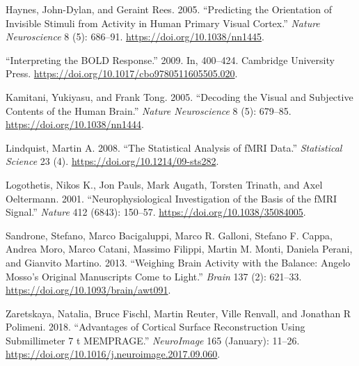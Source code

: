 \documentclass[
  letterpaper,
]{report}
\newlength{\cslhangindent}
\newenvironment{CSLReferences}[2] %
 {\begin{list}{}{%
  \setlength{\itemindent}{0pt}
  \setlength{\leftmargin}{0pt}
  \setlength{\parsep}{0pt}
  \ifodd #1
   \setlength{\leftmargin}{\cslhangindent}
   \setlength{\itemindent}{-1\cslhangindent}
  \fi
  \setlength{\itemsep}{#2\baselineskip}}}
 {\end{list}}
\begin{document}
\begin{CSLReferences}{1}{0}
Haynes, John-Dylan, and Geraint Rees. 2005. {``Predicting the
Orientation of Invisible Stimuli from Activity in Human Primary Visual
Cortex.''} \emph{Nature Neuroscience} 8 (5): 686--91.
\url{https://doi.org/10.1038/nn1445}.

{``Interpreting the BOLD Response.''} 2009. In, 400--424. Cambridge
University Press. \url{https://doi.org/10.1017/cbo9780511605505.020}.

Kamitani, Yukiyasu, and Frank Tong. 2005. {``Decoding the Visual and
Subjective Contents of the Human Brain.''} \emph{Nature Neuroscience} 8
(5): 679--85. \url{https://doi.org/10.1038/nn1444}.

Lindquist, Martin A. 2008. {``The Statistical Analysis of fMRI Data.''}
\emph{Statistical Science} 23 (4).
\url{https://doi.org/10.1214/09-sts282}.

Logothetis, Nikos K., Jon Pauls, Mark Augath, Torsten Trinath, and Axel
Oeltermann. 2001. {``Neurophysiological Investigation of the Basis of
the fMRI Signal.''} \emph{Nature} 412 (6843): 150--57.
\url{https://doi.org/10.1038/35084005}.

Sandrone, Stefano, Marco Bacigaluppi, Marco R. Galloni, Stefano F.
Cappa, Andrea Moro, Marco Catani, Massimo Filippi, Martin M. Monti,
Daniela Perani, and Gianvito Martino. 2013. {``Weighing Brain Activity
with the Balance: Angelo Mosso{'}s Original Manuscripts Come to
Light.''} \emph{Brain} 137 (2): 621--33.
\url{https://doi.org/10.1093/brain/awt091}.

Zaretskaya, Natalia, Bruce Fischl, Martin Reuter, Ville Renvall, and
Jonathan R Polimeni. 2018. {``Advantages of Cortical Surface
Reconstruction Using Submillimeter 7 t MEMPRAGE.''} \emph{NeuroImage}
165 (January): 11--26.
\url{https://doi.org/10.1016/j.neuroimage.2017.09.060}.

\end{CSLReferences}
\end{document}
